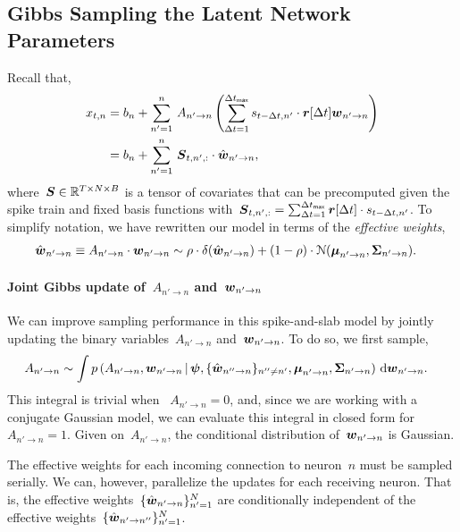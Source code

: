 \documentclass[aos]{imsart} %
\begin{document}
\subsection{Gibbs Sampling the Latent Network Parameters}
Recall that,
\begin{align}
x_{t,n} &= b_{n} + \sum_{n'=1}^n \,A_{n'\to n} \left( \sum_{\Delta t=1}^{\Delta t_{\mathsf{max}}} s_{t-\Delta t, n'} \cdot \br[\Delta t] \bw_{n'\to n} \right) \\
\label{eq:x} &= b_n + \sum_{n'=1}^n \, \bS_{t,n',:} \cdot \hat{\bw}_{n' \to n},
\end{align}
where~${\boldsymbol{S} \in \mathbb{R}^{T \times N \times B}}$ is a tensor of covariates that can be precomputed given the spike train and fixed basis functions with~${\boldsymbol{S}_{t,n',:}=\sum_{\Delta t=1}^{\Delta t_{\mathsf{max}}} \boldsymbol{r}[\Delta t] \cdot s_{t-\Delta t, n'}}$. To simplify notation, we have rewritten our model in terms of the \emph{effective weights},
\begin{align}
\hat{\bw}_{n' \to n} \equiv A_{n' \to n} \cdot \bw_{n' \to n} &\sim \rho \cdot \delta(\hat{\bw}_{n' \to n}) + (1-\rho) \cdot \distNormal(\bmu_{n' \to n}, \bSigma_{n' \to n}).
\end{align}

\paragraph{Joint Gibbs update of~$A_{n' \to n}$ and~$\boldsymbol{w}_{n' \to n}$}  We can improve sampling performance in this spike-and-slab model by jointly updating the binary variables~$A_{n' \to n}$ and~$\boldsymbol{w}_{n' \to n}$. To do so, we first sample,
\begin{align}
A_{n' \to n} &\sim \int p\left(A_{n' \to n}, \bw_{n' \to n} \given \bpsi, \{\hat{\bw}_{n'' \to n}\}_{n'' \neq n'}, \bmu_{n' \to n}, \bSigma_{n' \to n} \right) \,\mathrm{d}\bw_{n' \to n}.
\end{align}
This integral is trivial when ~$A_{n'\to n}=0$, and, since we are working with a conjugate Gaussian model, we can evaluate this integral in closed form for~$A_{n' \to n}=1$. Given on~$A_{n' \to n}$, the conditional distribution of~$\boldsymbol{w}_{n' \to n}$ is Gaussian.

The effective weights for each incoming connection to neuron~$n$ must be sampled serially. We can, however, parallelize the updates for each receiving neuron. That is, the effective weights~$\{\hat{\boldsymbol{w}}_{n' \to n}\}_{n'=1}^N$ are conditionally independent of the effective weights~$\{\hat{\boldsymbol{w}}_{n' \to n''}\}_{n'=1}^N$. 
\end{document}
